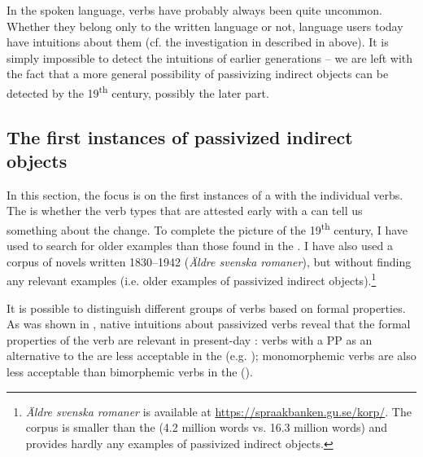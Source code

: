 \documentclass[output=paper]{langscibook}
\begin{document}
In the spoken language,  verbs have probably always been quite uncommon. Whether they belong only to the written language or not, language users today have intuitions about them (cf. the investigation in \citealt{HaddicanHolmberg2019} described in  above). It is simply impossible to detect the intuitions of earlier generations – we are left with the fact that a more general possibility of passivizing indirect objects can be detected by the 19\textsuperscript{th} century, possibly the later part.


\subsection{The first instances of passivized indirect objects}\label{sec:falk:3.7}\largerpage


In this section, the focus is on the first instances of a  with the individual verbs. The  is whether the verb types that are attested early with a  can tell us something about the change. To complete the picture of the 19\textsuperscript{th} century, I have used  to search for older examples than those found in the . I have also used a corpus of  novels written 1830–1942 (\textit{Äldre svenska romaner}), but without finding any relevant examples (i.e. older examples of passivized indirect objects).\footnote{\textit{Äldre svenska romaner} is available at \url{https://spraakbanken.gu.se/korp/}. The corpus is smaller than the  (4.2 million words vs. 16.3 million words) and provides hardly any examples of passivized indirect objects.}


It is possible to distinguish different groups of verbs based on formal properties. As was shown in , native  intuitions about passivized  verbs reveal that the formal properties of the verb are relevant in present-day : verbs with a PP as an alternative to the  are less acceptable in the  (e.g. \citealt{Anward1989}); monomorphemic verbs are also less acceptable than bimorphemic verbs in the  (\citealt{HolmbergPlatzack1995,HaddicanHolmberg2019}).
\end{document}
